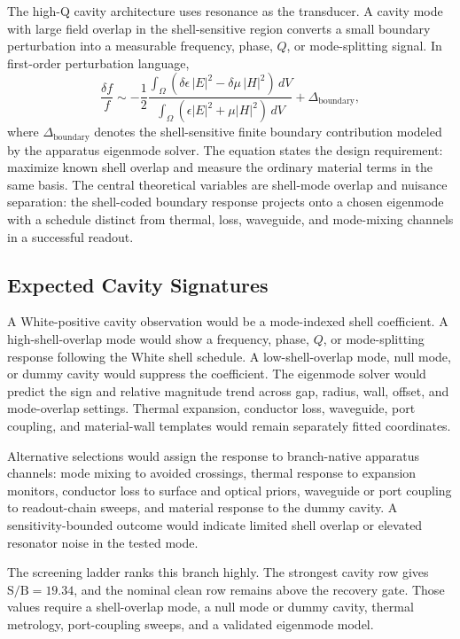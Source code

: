 \documentclass[11pt]{article}
\newcommand{\sbr}{\mathrm{S/B}}
\begin{document}
The high-Q cavity architecture uses resonance as the transducer. A cavity mode
with large field overlap in the shell-sensitive region converts a small
boundary perturbation into a measurable frequency, phase, \(Q\), or
mode-splitting signal. In first-order perturbation language,
\begin{equation}
  \frac{\delta f}{f}
  \sim
  -\frac{1}{2}
  \frac{\int_{\Omega}
  \left(\delta\epsilon\, |E|^2 - \delta\mu\, |H|^2\right)\,dV}
  {\int_{\Omega}
  \left(\epsilon |E|^2 + \mu |H|^2\right)\,dV}
  + \Delta_{\mathrm{boundary}},
  \label{eq:cavity}
\end{equation}
where \(\Delta_{\mathrm{boundary}}\) denotes the shell-sensitive finite
boundary contribution modeled by the apparatus eigenmode solver. The equation
states the design requirement: maximize known shell overlap and measure the
ordinary material terms in the same basis. The central theoretical variables
are shell-mode overlap and nuisance separation: the shell-coded boundary
response projects onto a chosen eigenmode with a schedule distinct from
thermal, loss, waveguide, and mode-mixing channels in a successful readout.

\subsection{Expected Cavity Signatures}

A White-positive cavity observation would be a mode-indexed shell coefficient.
A high-shell-overlap mode would show a frequency, phase, \(Q\), or
mode-splitting response following the White shell schedule. A
low-shell-overlap mode, null mode, or dummy cavity would suppress the
coefficient. The eigenmode solver would predict the sign and relative
magnitude trend across gap, radius, wall, offset, and mode-overlap settings.
Thermal expansion, conductor loss, waveguide, port coupling, and material-wall
templates would remain separately fitted coordinates.

Alternative selections would assign the response to branch-native apparatus
channels: mode mixing to avoided crossings, thermal response to expansion
monitors, conductor loss to surface and optical priors, waveguide or port
coupling to readout-chain sweeps, and material response to the dummy cavity. A
sensitivity-bounded outcome would indicate limited shell overlap or elevated
resonator noise in the tested mode.

The screening ladder ranks this branch highly. The strongest cavity row gives
\(\sbr=19.34\), and the nominal clean row remains above the recovery gate.
Those values require a shell-overlap mode, a null mode or dummy cavity,
thermal metrology, port-coupling sweeps, and a validated eigenmode model.
\end{document}
